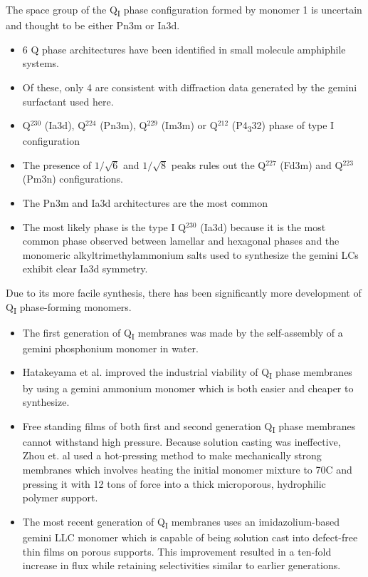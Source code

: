   The space group of the Q\textsubscript{I} phase configuration formed by
  monomer 1 is uncertain and thought to be either Pn3m or Ia3d.  %
  \begin{itemize}
    \item 6 Q phase architectures have been identified in small molecule
    amphiphile systems.~\cite{mariani_cubic_1988}
    \item Of these, only 4 are consistent with diffraction data generated
    by the gemini surfactant used here.~\cite{pindzola_cross-linked_2003}
    \item Q$^{230}$ (Ia3d), Q$^{224}$ (Pn3m), Q$^{229}$ (Im3m) or Q$^{212}$ (P4\textsubscript{3}32) phase of type I configuration
    \item The presence of $1 / \sqrt{6}$ and $1 / \sqrt{8}$ peaks rules out the
    Q$^{227}$ (Fd3m) and Q$^{223}$ (Pm3n) configurations.
    \item The Pn3m and Ia3d architectures are the most common~\cite{mariani_cubic_1988,wiesenauer_nanoporous_2012}
    \item The most likely phase is the type I Q$^{230}$ (Ia3d) because it is the
    most common phase observed between lamellar and hexagonal phases and the
    monomeric alkyltrimethylammonium salts used to synthesize the gemini LCs
    exhibit clear Ia3d symmetry.
  \end{itemize}
  
  Due to its more facile synthesis, there has been significantly more development
  of Q\textsubscript{I} phase-forming monomers.
  \begin{itemize}
    \item The first generation of Q\textsubscript{I} membranes was made by 
    the self-assembly of a gemini phosphonium monomer in water.~\cite{pindzola_cross-linked_2003}
    \item Hatakeyama et al. improved the industrial viability of Q\textsubscript{I} 
    phase membranes by using a gemini ammonium monomer which is both easier and cheaper
    to synthesize.~\cite{hatakeyama_nanoporous_2010}
    \item Free standing films of both first and second generation Q\textsubscript{I} phase 
    membranes cannot withstand high pressure. Because solution casting was ineffective, Zhou
    et. al used a hot-pressing method to make mechanically strong membranes which involves 
    heating the initial monomer mixture to 70\degree C and pressing it with 12 tons of force
    into a thick microporous, hydrophilic polymer support.~\cite{zhou_new_2007}
    \item The most recent generation of Q\textsubscript{I} membranes uses an imidazolium-based
    gemini LLC monomer which is capable of being solution cast into defect-free thin films on
    porous supports. This improvement resulted in a ten-fold increase in flux while retaining
    selectivities similar to earlier generations.~\cite{carter_glycerol-based_2012}
  \end{itemize}
  
